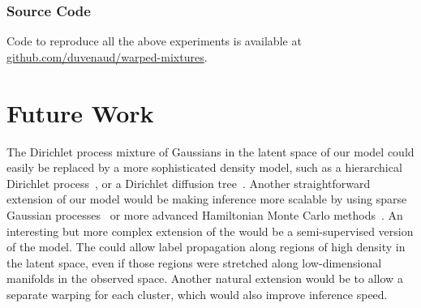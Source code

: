 \subsubsection{Source Code}
Code to reproduce all the above experiments is available at \url{github.com/duvenaud/warped-mixtures}.



\section{Future Work}

The Dirichlet process mixture of Gaussians in the latent space of our model could easily be replaced by a more sophisticated density model, such as a hierarchical Dirichlet process~\citep{teh2006hierarchical}, or a Dirichlet diffusion tree~\citep{neal2003density}.
Another straightforward extension of our model would be making inference more scalable by using sparse Gaussian processes~\citep{quinonero2005unifying,snelson2006sparse} or more advanced Hamiltonian Monte Carlo methods~\citep{zhang2011quasi}.
An interesting but more complex extension of the \iwmm{} would be a semi-supervised version of the model.
The \iwmm{} could allow label propagation along regions of high density in the latent space, even if those regions were stretched along low-dimensional manifolds in the observed space.  Another natural extension would be to allow a separate warping for each cluster, which would also improve inference speed.




%
%

